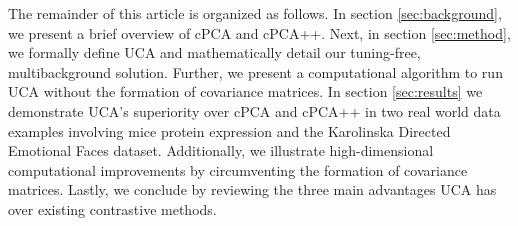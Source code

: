 \documentclass[10pt]{article}
\begin{document}
The remainder of this article is organized as follows. In section \ref{sec:background}, we present a brief overview of cPCA and cPCA++. Next, in section \ref{sec:method}, we formally define UCA and mathematically detail our tuning-free, multibackground solution. Further, we present a computational algorithm to run UCA without the formation of covariance matrices. In section \ref{sec:results} we demonstrate UCA's superiority over cPCA and cPCA++ in two real world data examples involving mice protein expression and the Karolinska Directed Emotional Faces dataset. Additionally, we illustrate high-dimensional computational improvements by circumventing the formation of covariance matrices. Lastly, we conclude by reviewing the three main advantages UCA has over existing contrastive methods.

\end{document}
